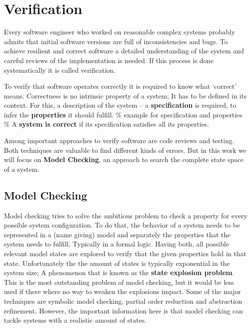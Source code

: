 \section{Verification}
\label{rel_mc}
Every software engineer who worked on reasonable complex systems probably admits that initial software versions are full of inconsistencies and bugs.
To achieve resilient and correct software a detailed understanding of the system and careful reviews of the implementation is needed.
If this process is done systematically it is called verification.

To verify that software operates correctly it is required to know what `correct' means.
Correctness is no intrinsic property of a system;
It has to be defined in its context.
For this, a description of the system -- a \textbf{specification} is required, to infer the \textbf{properties} it should fulfill.
\% example for specification and properties \%
A \textbf{system is correct} if its specification satisfies all its properties\cite[Chapter 1]{baier2008principles}.

Among important approaches to verify software are code reviews and testing.
Both techniques are valuable to find different kinds of errors.
But in this work we will focus on \textbf{Model Checking}, an approach to search the complete state space of a system.

\subsection{Model Checking}
Model checking tries to solve the ambitious problem to check a property for every possible system configuration.
To do that, the behavior of a system needs to be represented in a (name giving) model
and separately the properties that the system needs to fulfill;
Typically in a formal logic.
Having both, all possible relevant model states are explored to verify that the given properties hold in that state.
Unfortunately the the amount of states is typically exponential in the system size;
A phenomenon that is known as the \textbf{state explosion problem}\cite[Introduction]{mcmillan1993symbolic}.
This is the most outstanding problem of model checking, but it would be less used if there where no way to weaken the explosions impact.
Some of the major techniques are symbolic model checking, partial order reduction and abstraction refinement\cite[Chapter 5]{clarke2011model}.
However, the important information here is that model checking can tackle systems with a realistic amount of states.

